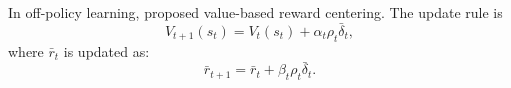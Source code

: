In off-policy learning, \citet{naik2024reward} 
proposed value-based reward centering.
The update rule is
\begin{equation}
  \label{rewardcentering1}
V_{t+1}(s_t)=V_{t}(s_t)+\alpha_t \rho_t \bar{\delta}_t,
\end{equation}
where $\bar{r}_{t}$ is updated as:
\begin{equation}
  \label{rewardcentering2}
\bar{r}_{t+1}=\bar{r}_{t}+\beta_t \rho_t\bar{\delta}_t.
\end{equation}

% 
% 



